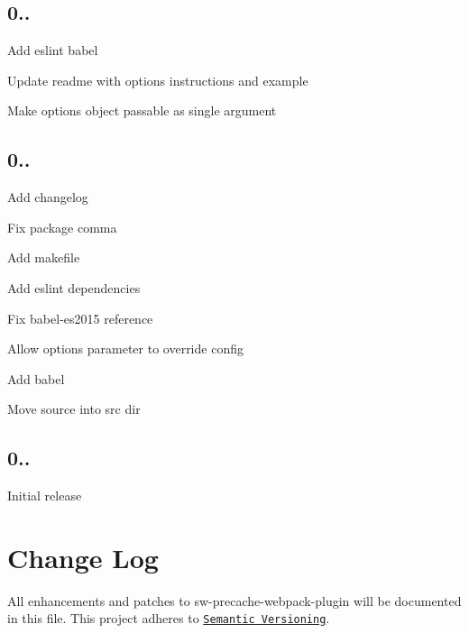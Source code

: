 \subsection*{0..}


\begin{DoxyItemize}
\item Add eslint babel
\item Update readme with options instructions and example
\item Make options object passable as single argument
\end{DoxyItemize}

\subsection*{0..}


\begin{DoxyItemize}
\item Add changelog
\item Fix package comma
\item Add makefile
\item Add eslint dependencies
\item Fix babel-\/es2015 reference
\item Allow options parameter to override config
\item Add babel
\item Move source into src dir
\end{DoxyItemize}

\subsection*{0..}


\begin{DoxyItemize}
\item Initial release
\end{DoxyItemize}

\section*{Change Log}

All enhancements and patches to sw-\/precache-\/webpack-\/plugin will be documented in this file. This project adheres to \href{http://semver.org/}{\tt Semantic Versioning}. 